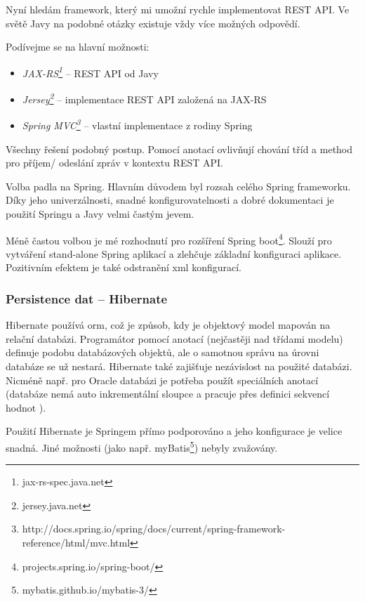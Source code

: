 \documentclass[thesis=B,czech]{FITthesis}[2012/06/26]
\begin{document}
Nyní hledám framework, který mi umožní rychle implementovat REST API. Ve světě Javy na podobné otázky existuje vždy více možných odpovědí.
\newline

Podívejme se na hlavní možnosti:
\begin{itemize}[nosep]
	\item \textit{JAX-RS\footnote{jax-rs-spec.java.net}} -- REST API od Javy
    \item \textit{Jersey\footnote{jersey.java.net}} -- implementace REST API založená na JAX-RS
    \item \textit{Spring MVC\footnote{http://docs.spring.io/spring/docs/current/spring-framework-reference/html/mvc.html}} -- vlastní implementace z rodiny Spring
\end{itemize}
\vspace*{1\baselineskip}

Všechny řešení podobný postup. Pomocí anotací ovlivňují chování tříd a method pro příjem/ odeslání zpráv v kontextu REST API. 

Volba padla na Spring. Hlavním důvodem byl rozsah celého Spring frameworku. Díky jeho univerzálnosti, snadné konfigurovatelnosti a dobré dokumentaci je použití Springu a Javy velmi častým jevem.    

Méně častou volbou je mé rozhodnutí pro rozšíření Spring boot\footnote{projects.spring.io/spring-boot/}. Slouží pro vytváření stand-alone Spring aplikací a zlehčuje základní konfiguraci aplikace. Pozitivním efektem je také odstranění \acrshort{xml} konfigurací\cite{technology_spring_boot}.

\subsubsection{Persistence dat -- Hibernate}
\label{technology:hibernate} 

Hibernate\cite{technology_hibernate} používá \acrshort{orm}, což je způsob, kdy je objektový model mapován na relační databázi. Programátor pomocí anotací (nejčastěji nad třídami modelu) definuje podobu databázových objektů, ale o samotnou správu na úrovni databáze se už nestará. Hibernate také zajišťuje nezávislost na použité databázi. Nicméně např. pro Oracle databázi je potřeba použít speciálních anotací (databáze nemá auto inkrementální sloupce a pracuje přes definici sekvencí hodnot \cite{technology_hibernate_sequence}).

Použití Hibernate je Springem přímo podporováno a jeho konfigurace je velice snadná. Jiné možnosti (jako např. myBatis\footnote{mybatis.github.io/mybatis-3/}) nebyly zvažovány.
\end{document}
